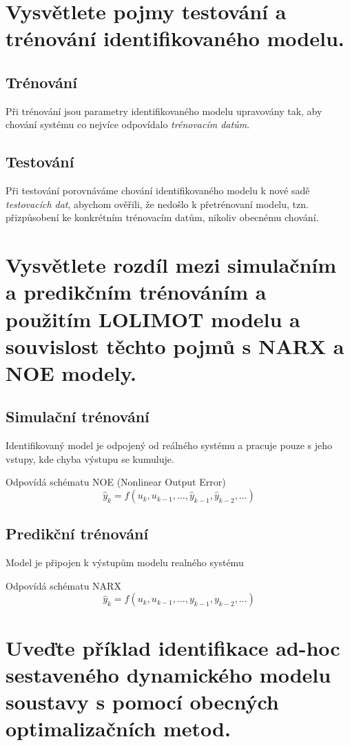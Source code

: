 \documentclass{article}
\begin{document}
	\section{Vysvětlete pojmy testování a trénování identifikovaného modelu.}

	\subsection*{Trénování}
	Při trénování jsou parametry identifikovaného modelu upravovány tak, aby chování systému co nejvíce odpovídalo \emph{trénovacím datům}.

	\subsection*{Testování}
	Při testování porovnáváme chování identifikovaného modelu k nové sadě \emph{testovacích dat}, abychom ověřili, že nedošlo k přetrénovaní modelu, tzn. přizpůsobení ke konkrétním trénovacím datům, nikoliv obecnému chování.

	\section{Vysvětlete rozdíl mezi simulačním a predikčním trénováním a použitím LOLIMOT modelu a souvislost těchto pojmů s NARX a NOE modely. }

	\subsection*{Simulační trénování}
	Identifikovaný model je odpojený od reálného systému a pracuje pouze s jeho vstupy, kde chyba výstupu se kumuluje.

	Odpovídá schématu NOE (Nonlinear Output Error)
	\begin{equation}
		\hat{y}_k = f(u_k,u_{k-1},\dots,\hat{y}_{k-1},\hat{y}_{k-2},\dots)
	\end{equation}

	\subsection*{Predikční trénování}
	Model je připojen k výstupům modelu realného systému

	Odpovídá schématu NARX
	\begin{equation}
		\hat{y}_k = f(u_k,u_{k-1},\dots,y_{k-1},y_{k-2},\dots)
	\end{equation}

	\section{Uveďte příklad identifikace ad-hoc sestaveného dynamického modelu soustavy s pomocí obecných optimalizačních metod. }
\end{document}
